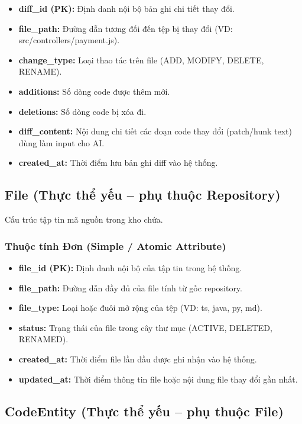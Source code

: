 \begin{itemize}
    \item \textbf{diff\_id (PK):} Định danh nội bộ bản ghi chi tiết thay đổi.
    \item \textbf{file\_path:} Đường dẫn tương đối đến tệp bị thay đổi (VD: src/controllers/payment.js).
    \item \textbf{change\_type:} Loại thao tác trên file (ADD, MODIFY, DELETE, RENAME).
    \item \textbf{additions:} Số dòng code được thêm mới.
    \item \textbf{deletions:} Số dòng code bị xóa đi.
    \item \textbf{diff\_content:} Nội dung chi tiết các đoạn code thay đổi (patch/hunk text) dùng làm input cho AI.
    \item \textbf{created\_at:} Thời điểm lưu bản ghi diff vào hệ thống.
\end{itemize}


\subsection{File (Thực thể yếu -- phụ thuộc Repository)}

Cấu trúc tập tin mã nguồn trong kho chứa.

\subsubsection{Thuộc tính Đơn (Simple / Atomic Attribute)}

\begin{itemize}
    \item \textbf{file\_id (PK):} Định danh nội bộ của tập tin trong hệ thống.
    \item \textbf{file\_path:} Đường dẫn đầy đủ của file tính từ gốc repository.
    \item \textbf{file\_type:} Loại hoặc đuôi mở rộng của tệp (VD: ts, java, py, md).
    \item \textbf{status:} Trạng thái của file trong cây thư mục (ACTIVE, DELETED, RENAMED).
    \item \textbf{created\_at:} Thời điểm file lần đầu được ghi nhận vào hệ thống.
    \item \textbf{updated\_at:} Thời điểm thông tin file hoặc nội dung file thay đổi gần nhất.
\end{itemize}


\subsection{CodeEntity (Thực thể yếu -- phụ thuộc File)}

